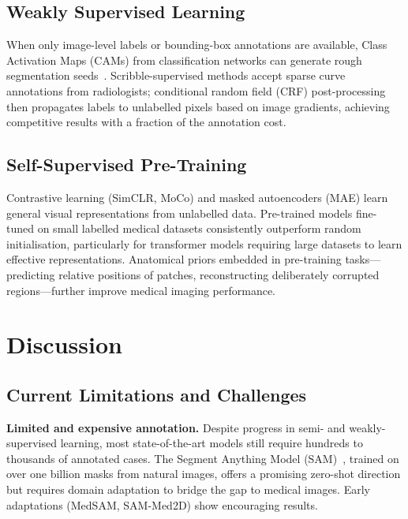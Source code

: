 \documentclass[preprint,12pt,authoryear]{elsarticle}
\begin{document}
\subsection{Weakly Supervised Learning}
\label{sec:wsl}

When only image-level labels or bounding-box annotations are available, Class
Activation Maps (CAMs) from classification networks can generate rough
segmentation seeds~\citep{qureshi2023review}. Scribble-supervised methods accept
sparse curve annotations from radiologists; conditional random field (CRF)
post-processing then propagates labels to unlabelled pixels based on image
gradients, achieving competitive results with a fraction of the annotation cost.

\subsection{Self-Supervised Pre-Training}
\label{sec:selfsup}

Contrastive learning (SimCLR, MoCo) and masked autoencoders (MAE) learn general
visual representations from unlabelled data. Pre-trained models fine-tuned on
small labelled medical datasets consistently outperform random initialisation,
particularly for transformer models requiring large datasets to learn effective
representations. Anatomical priors embedded in pre-training tasks---predicting
relative positions of patches, reconstructing deliberately corrupted
regions---further improve medical imaging performance.

\section{Discussion}
\label{sec:discussion}

\subsection{Current Limitations and Challenges}
\label{sec:limitations}

\textbf{Limited and expensive annotation.} Despite progress in semi- and
weakly-supervised learning, most state-of-the-art models still require hundreds
to thousands of annotated cases. The Segment Anything Model
(SAM)~\citep{kirillov2023sam}, trained on over one billion masks from natural
images, offers a promising zero-shot direction but requires domain adaptation to
bridge the gap to medical images. Early adaptations (MedSAM, SAM-Med2D) show
encouraging results.
\end{document}
